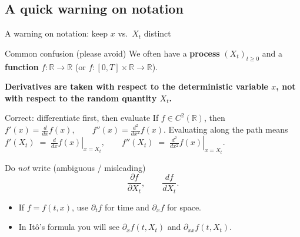 \documentclass[10pt,aspectratio=169]{beamer}
\newcommand{\R}{\mathbb{R}}
\begin{document}


\subsection{A quick warning on notation}

\begin{frame}{A warning on notation: keep $x$ vs.\ $X_t$ distinct}

\begin{alertblock}{Common confusion (please avoid)}
We often have a \textbf{process} $(X_t)_{t\ge0}$ and a \textbf{function}
$f:\R\to\R$ (or $f:[0,T]\times\R\to\R$).\medskip

\textbf{Derivatives are taken with respect to the deterministic variable $x$,
not with respect to the random quantity $X_t$.}
\end{alertblock}\pause

\begin{block}{Correct: differentiate first, then evaluate}
If $f\in C^2(\R)$, then
$
f'(x)=\frac{d}{dx}f(x),\qquad f''(x)=\frac{d^2}{dx^2}f(x).
$
Evaluating along the path means
$
f'(X_t)
\;=\;
\left.\frac{d}{dx}f(x)\right|_{x=X_t},
\qquad
f''(X_t)
\;=\;
\left.\frac{d^2}{dx^2}f(x)\right|_{x=X_t}.
$
\end{block}\pause

\begin{block}{Do \emph{not} write (ambiguous / misleading)}
\[
\frac{\partial f}{\partial X_t},
\qquad
\frac{df}{dX_t}.
\]
\end{block}\pause

\begin{itemize}
  \item If $f=f(t,x)$, use $\partial_t f$ for time and $\partial_x f$ for space.\pause
  \item In It\^o's formula you will see $\partial_x f(t,X_t)$ and $\partial_{xx} f(t,X_t)$.
\end{itemize}

\end{frame}
\end{document}
